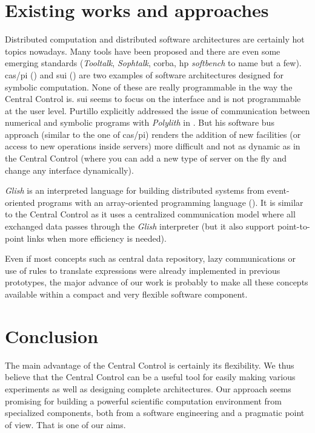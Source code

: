 \documentclass {article}
\begin{document}
\section{ Existing works and approaches }


Distributed computation and distributed software architectures are certainly 
hot topics nowadays. Many tools have been proposed and there are even some
emerging standards ({\sl Tooltalk}, {\sl Sophtalk}, {\sc corba}, {\sc hp}
{\sl softbench} to name but a few).
{\sc cas/pi} (\cite{CASPI}) and {\sc sui} (\cite{kn:doleh}) are two examples
of software architectures designed for symbolic computation.
None of these are really programmable in the way the Central Control is.
{\sc sui} seems to focus on the interface and is not programmable at the user
level. 
Purtillo  explicitly addressed the issue of communication
between numerical and symbolic programs with {\sl Polylith} in
\cite{kn:purtillo1}. But his software bus approach (similar to the one of 
{\sc cas/pi}) renders the addition of new facilities (or access to new
operations inside servers) more difficult and not as dynamic as in the
Central Control (where you can add a new type of server on 
the fly and change any interface dynamically).

{\sl Glish} is an interpreted language for building distributed systems from 
event-oriented programs with an array-oriented programming language
(\cite{kn:GLISH}). 
It is similar to the Central Control as it uses a centralized communication
model where all exchanged data passes through the {\sl Glish} interpreter
(but it also support point-to-point links when more efficiency is needed).

Even if most concepts such as central data repository, lazy communications or
use of rules to translate expressions were already implemented in previous
prototypes, the major advance of our work is probably to make all these
concepts available within a compact and very flexible software component.

\section{ Conclusion }

The main advantage of the Central Control is certainly its flexibility. 
We thus believe that the Central Control can be a useful tool for easily
making various experiments as well as designing complete architectures.
Our approach seems promising for building a powerful scientific computation
environment from specialized components, both from a software engineering
and a pragmatic point of view. That is one of our aims.
\end{document}
